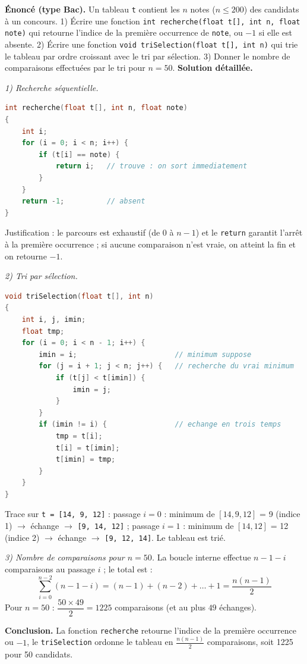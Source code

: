 \documentclass[11pt]{article}
\begin{document}
\begin{exoresolu}
\textbf{Énoncé (type Bac).} Un tableau \texttt{t} contient les $n$ notes ($n \leq 200$) des candidats à un concours. 1) Écrire une fonction \texttt{int recherche(float t[], int n, float note)} qui retourne l'indice de la première occurrence de \texttt{note}, ou $-1$ si elle est absente. 2) Écrire une fonction \texttt{void triSelection(float t[], int n)} qui trie le tableau par ordre croissant avec le tri par sélection. 3) Donner le nombre de comparaisons effectuées par le tri pour $n = 50$.
\tcblower
\textbf{Solution détaillée.}

\emph{1) Recherche séquentielle.}
\begin{lstlisting}[language=C]
int recherche(float t[], int n, float note)
{
    int i;
    for (i = 0; i < n; i++) {
        if (t[i] == note) {
            return i;   // trouve : on sort immediatement
        }
    }
    return -1;          // absent
}
\end{lstlisting}
Justification : le parcours est exhaustif (de 0 à $n-1$) et le \texttt{return} garantit l'arrêt à la première occurrence ; si aucune comparaison n'est vraie, on atteint la fin et on retourne $-1$.

\emph{2) Tri par sélection.}
\begin{lstlisting}[language=C]
void triSelection(float t[], int n)
{
    int i, j, imin;
    float tmp;
    for (i = 0; i < n - 1; i++) {
        imin = i;                       // minimum suppose
        for (j = i + 1; j < n; j++) {   // recherche du vrai minimum
            if (t[j] < t[imin]) {
                imin = j;
            }
        }
        if (imin != i) {                // echange en trois temps
            tmp = t[i];
            t[i] = t[imin];
            t[imin] = tmp;
        }
    }
}
\end{lstlisting}
Trace sur \texttt{t = [14, 9, 12]} : passage $i=0$ : minimum de $[14, 9, 12]$ = 9 (indice 1) $\to$ échange $\to$ \texttt{[9, 14, 12]} ; passage $i=1$ : minimum de $[14, 12]$ = 12 (indice 2) $\to$ échange $\to$ \texttt{[9, 12, 14]}. Le tableau est trié.

\emph{3) Nombre de comparaisons pour $n = 50$.} La boucle interne effectue $n - 1 - i$ comparaisons au passage $i$ ; le total est :
\[
\sum_{i=0}^{n-2} (n - 1 - i) = (n-1) + (n-2) + \dots + 1 = \frac{n(n-1)}{2}
\]
Pour $n = 50$ : $\dfrac{50 \times 49}{2} = \num{1225}$ comparaisons (et au plus $49$ échanges).

\textbf{Conclusion.} La fonction \texttt{recherche} retourne l'indice de la première occurrence ou $-1$, le \texttt{triSelection} ordonne le tableau en $\frac{n(n-1)}{2}$ comparaisons, soit \num{1225} pour 50 candidats.
\end{exoresolu}
\end{document}
